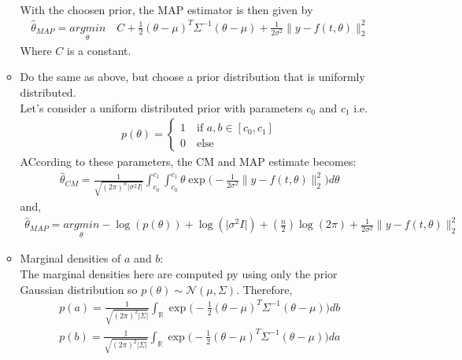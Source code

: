 \documentclass[11pt,a4paper]{article}
\newcommand{\R}{\mathbb{R}}
\begin{document}
\begin{enumerate}
\begin{itemize}
\begin{align*}
\end{align*}
With the choosen prior, the MAP estimator is then given by  \\
\begin{align*}
	\boxed{\hat{\theta}_{MAP} = \underset{\theta}{argmin }\quad C+\frac{1}{2}(\theta-\mu)^{T}\Sigma^{-1}(\theta-\mu)+ \frac{1}{2\sigma^2}\lVert y-f(t,\theta)\rVert_2^2}
\end{align*}
Where $ C $ is a constant.
\item  Do the same as above, but choose a prior distribution that is
uniformly distributed.\\
Let's consider a uniform distributed prior with parameters $ c_0 $ and $ c_1 $ i.e. \begin{align*}
	p(\theta)  = \begin{cases}
		1\quad \text{if } a,b\in [c_0,c_1]\\
		0\quad \text{else}
	\end{cases}
\end{align*} 
ACcording to these parameters, the CM and MAP estimate becomes:
\begin{align*}
		\boxed{\hat{\theta}_{CM} =  \frac{1}{\sqrt{(2\pi)^n\lvert \sigma^2I\rvert}}\int_{c_0}^{c_1}\int_{c_0}^{c_1}\theta\exp\big(-\frac{1}{2\sigma^2}\lVert y-f(t,\theta)\rVert_2^2\big)d\theta}
\end{align*}
and,
\begin{align}\label{1}
	\boxed{\hat{\theta}_{MAP} = \underset{\theta}{argmin} -\log(p(\theta))+\log(\lvert \sigma^{2}I\rvert)+(\frac{n}{2})\log(2\pi)+ \frac{1}{2\sigma^2}\lVert y-f(t,\theta)\rVert_2^2}
\end{align}
\item Marginal densities of $ a $ and $ b $:\\
The marginal densities here  are computed py using only the prior Gaussian distribution so $ p(\theta)\sim \mathcal{N}(\mu,\Sigma) $.
Therefore,\begin{align*}
	p(a) = \frac{1}{\sqrt{(2\pi)^2\lvert\Sigma\rvert}}\int_{\R}\exp\big(-\frac{1}{2}(\theta-\mu)^T\Sigma^{-1}(\theta-\mu)\big)db\\
	p(b) = \frac{1}{\sqrt{(2\pi)^2\lvert\Sigma\rvert}}\int_{\R}\exp\big(-\frac{1}{2}(\theta-\mu)^T\Sigma^{-1}(\theta-\mu)\big)da
\end{align*}
 

\end{itemize}
\end{enumerate}
\end{document}
